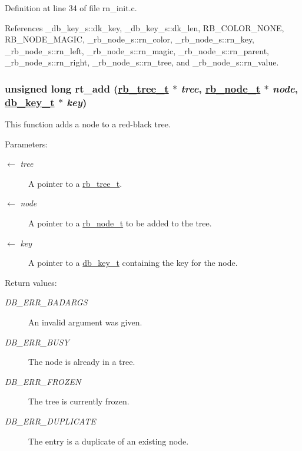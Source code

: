 Definition at line 34 of file rn\_\-init.c.

References \_\-db\_\-key\_\-s::dk\_\-key, \_\-db\_\-key\_\-s::dk\_\-len, RB\_\-COLOR\_\-NONE, RB\_\-NODE\_\-MAGIC, \_\-rb\_\-node\_\-s::rn\_\-color, \_\-rb\_\-node\_\-s::rn\_\-key, \_\-rb\_\-node\_\-s::rn\_\-left, \_\-rb\_\-node\_\-s::rn\_\-magic, \_\-rb\_\-node\_\-s::rn\_\-parent, \_\-rb\_\-node\_\-s::rn\_\-right, \_\-rb\_\-node\_\-s::rn\_\-tree, and \_\-rb\_\-node\_\-s::rn\_\-value.\hypertarget{group__dbprim__rbtree_ga7}{
\subsubsection[rt\_\-add]{\setlength{\rightskip}{0pt plus 5cm}unsigned long rt\_\-add (\hyperlink{struct__rb__tree__s}{rb\_\-tree\_\-t} $\ast$ {\em tree}, \hyperlink{struct__rb__node__s}{rb\_\-node\_\-t} $\ast$ {\em node}, \hyperlink{struct__db__key__s}{db\_\-key\_\-t} $\ast$ {\em key})}}
\label{group__dbprim__rbtree_ga7}


This function adds a node to a red-black tree.

\begin{Desc}
\item[Parameters:]
\begin{description}
\item[\mbox{$\leftarrow$} {\em tree}]A pointer to a \hyperlink{group__dbprim__rbtree_ga0}{rb\_\-tree\_\-t}. \item[\mbox{$\leftarrow$} {\em node}]A pointer to a \hyperlink{group__dbprim__rbtree_ga1}{rb\_\-node\_\-t} to be added to the tree. \item[\mbox{$\leftarrow$} {\em key}]A pointer to a \hyperlink{group__dbprim_ga0}{db\_\-key\_\-t} containing the key for the node.\end{description}
\end{Desc}
\begin{Desc}
\item[Return values:]
\begin{description}
\item[{\em DB\_\-ERR\_\-BADARGS}]An invalid argument was given. \item[{\em DB\_\-ERR\_\-BUSY}]The node is already in a tree. \item[{\em DB\_\-ERR\_\-FROZEN}]The tree is currently frozen. \item[{\em DB\_\-ERR\_\-DUPLICATE}]The entry is a duplicate of an existing node.\end{description}
\end{Desc}


